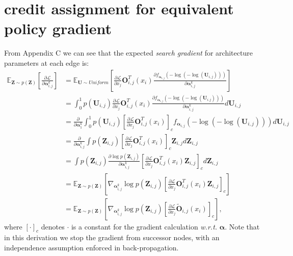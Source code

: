 \documentclass{article} \usepackage{iclr2019_conference,times}
\begin{document}
\section{credit assignment for equivalent policy gradient}
From Appendix C we can see that the expected \textit{search gradient} for architecture parameters at each edge is:
\begin{equation}
\begin{split}
\mathbb{E}_{\bm{Z}\sim p(\bm{Z})}[\frac{\partial \mathcal{L}}{\partial \bm{\alpha}_{i,j}^{k}}] 
&= \mathbb{E}_{\bm{U}\sim Uniform}[\frac{\partial \mathcal{L}}{\partial x_{j}}\bm{O}_{i,j}^{T}(x_{i})\frac{\partial f_{\bm{\alpha}_{i,j}}(-\log(-\log(\bm{U}_{i,j})))}{\partial \bm{\alpha}_{i,j}^{k}}]\\
&= \int_{0}^{1} p(\bm{U}_{i,j}) \frac{\partial \mathcal{L}}{\partial x_{j}}\bm{O}_{i,j}^{T}(x_{i})\frac{\partial f_{\bm{\alpha}_{i,j}}(-\log(-\log(\bm{U}_{i.j})))}{\partial \bm{\alpha}_{i,j}^{k}} d\bm{U}_{i,j} \\
&= \frac{\partial }{\partial \bm{\alpha}_{1}^{k}}\int_{0}^{1} p(\bm{U}_{i,j}) [\frac{\partial \mathcal{L}}{\partial x_{j}}\bm{O}_{i,j}^{T}(x_{i})]_{c}f_{\bm{\alpha}_{i,j}}(-\log(-\log(\bm{U}_{i,j}))) d\bm{U}_{i,j}\\
&= \frac{\partial }{\partial \bm{\alpha}_{i,j}^{k}}\int p(\bm{Z}_{i,j}) [\frac{\partial \mathcal{L}}{\partial x_{j}}\bm{O}_{i,j}^{T}(x_{i})]_{c} \bm{Z}_{i,j} d\bm{Z}_{i,j}\\
&= \int p(\bm{Z}_{i,j}) \frac{\partial \log p(\bm{Z}_{i,j})}{\partial \bm{\alpha}_{i,j}^{k}}[\frac{\partial \mathcal{L}}{\partial x_{j}}\bm{O}_{i,j}^{T}(x_{i}) \bm{Z}_{i,j}]_{c} d\bm{Z}_{i,j}\\
&= \mathbb{E}_{\bm{Z}\sim p(\bm{Z})}[\nabla_{\bm{\alpha}_{i,j}^{k}}\log p(\bm{Z}_{i,j})[\frac{\partial \mathcal{L}}{\partial x_{j}}\bm{O}_{i,j}^{T}(x_{i}) \bm{Z}_{i, j}]_{c}]\\
&= \mathbb{E}_{\bm{Z}\sim p(\bm{Z})}[\nabla_{\bm{\alpha}_{i,j}^{k}}\log p(\bm{Z}_{i,j})[\frac{\partial \mathcal{L}}{\partial x_{j}}\tilde{\bm{O}}_{i, j}(x_{i})]_{c}],
\end{split}
\end{equation}
where $[\cdot]_{c}$ denotes $\cdot$ is a constant for the gradient calculation \textit{w.r.t.} $\bm{\alpha}$. Note that in this derivation we stop the gradient from successor nodes, with an independence assumption enforced in back-propagation. 
\end{document}
